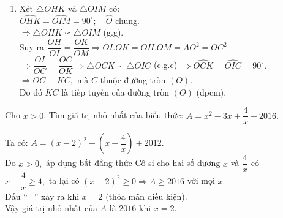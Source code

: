 \begin{ex}
{\begin{enumerate}
       	Mặt khác ta lại có $ MA $ là tiếp tuyến của đường tròn $ (O) $ nên $ OA \perp AM. $\\
       	Do đó $ A $ thuộc đường tròn đường kính $ OM. \hfill(2)$\\
       	Từ $ (1) $ và $ (2) $ ta có bốn điểm $ A,I,O,M $ thuộc đường tròn đường kính $ OM. $ 
       	\item  Xét $\triangle OHK $ và $ \triangle OIM $ có:\\
       	 $ \widehat{OHK}=\widehat{OIM}=90^{\circ};\quad \widehat{O}$ chung.\\
       	 $ \Rightarrow  \triangle OHK \backsim \triangle OIM $ (g.g).\\
       	 Suy ra $ \dfrac{OH}{OI}=\dfrac{OK}{OM} \Rightarrow OI.OK = OH.OM = AO^2=OC^2 $\\
       	 $ \Rightarrow \dfrac{OI}{OC}=\dfrac{OC}{OK} \Rightarrow \triangle OCK \backsim \triangle OIC $ (c.g.c) $ \Rightarrow \widehat{OCK}=\widehat{OIC}=90^{\circ}. $\\
       	 $ \Rightarrow OC \perp KC, $ mà $ C $ thuộc đường tròn $ (O). $\\
       	  Do đó $ KC $ là tiếp tuyến của đường tròn $ (O) $ (đpcm).
    \end{enumerate}
    
    }
\end{ex}


\begin{ex}%
    Cho $x>0$. Tìm giá trị nhỏ nhất của biểu thức: 
    $A=x^2-3x+\dfrac{4}{x}+2016.$    	
\loigiai
    {
    	Ta có: $A={\left(x-2\right)}^2+\left(x+\dfrac{4}{x}\right)+2012.$ \\
    	Do $x > 0, $ áp dụng bất đẳng thức Cô-si cho hai số dương $x$ và $\dfrac{4}{x} $ có\\
    	$x+\dfrac{4}{x} \geq 4,$ ta lại có ${\left(x-2\right)}^2\ge 0 \Rightarrow A\geq 2016$ với mọi $x.$\\
    	Dấu “=” xảy ra khi $x = 2$ (thỏa mãn điều kiện). \\
    	Vậy giá trị nhỏ nhất của $ A $ là $ 2016 $ khi $ x = 2. $
    	
    	
    }
\end{ex}

